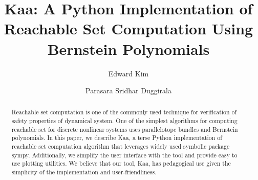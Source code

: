 \documentclass[EPiC]{easychair}
\begin{document}
%
\title{Kaa: A Python Implementation of Reachable Set Computation Using Bernstein Polynomials}
%
%
\author{Edward Kim
\and
Parasara Sridhar Duggirala
}
%
%
%
\maketitle              %
%
\begin{abstract}
Reachable set computation is one of the commonly used technique for verification of safety properties of dynamical system. 
%
One of the simplest algorithms for computing reachable set for discrete nonlinear systems uses parallelotope bundles and Bernstein polynomials.
%
In this paper, we describe Kaa, a terse Python implementation of reachable set computation algorithm that leverages widely used symbolic package sympy.
%
Additionally, we simplify the user interface with the tool and provide easy to use plotting utilities.
%
%
We believe that our tool, Kaa, has pedagogical use given the simplicity of the implementation and user-friendliness.
%
\end{abstract}

\end{document}

